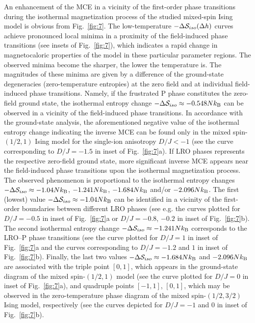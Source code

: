 \documentclass[final,5p,times,sort&compress]{elsarticle}
\begin{document}
An enhancement of the MCE in a vicinity of the first-order phase transitions during the isothermal magnetization process of the studied mixed-spin Ising model is obvious from Fig.~\ref{fig:7}. The low-temperature $-\Delta{\cal S}_{iso}(\Delta h)$ curves achieve pronounced local minima in a proximity of the field-induced phase transitions (see insets of Fig.~\ref{fig:7}), which indicates a rapid change in magnetocaloric properties of the model in these particular parameter regions. The observed minima become the sharper, the lower the temperature is. The magnitudes of these minima are given by a difference of the ground-state degeneracies (zero-temperature entropies) at the zero field and at individual field-induced phase transitions. 
Namely, if the frustrated P phase constitutes the zero-field ground state, the isothermal entropy change $-\Delta {\cal S}_{iso}\approx -0.548Nk_{\rm B}$ can be observed in a vicinity of the field-induced phase transitions. In accordance with the ground-state analysis, the aforementioned negative value of the isothermal entropy change indicating the inverse MCE can be found only in the mixed spin-$(1/2,1)$ Ising model for the single-ion anisotropy $D/J<-1$ (see the curve corresponding to $D/J=-1.5$ in inset of Fig.~\ref{fig:7}a). If LRO phases represents the respective zero-field ground state, more significant inverse MCE appears near the field-induced phase transitions upon the isothermal magnetization process. The observed phenomenon is proportional to the isothermal entropy changes $-\Delta {\cal S}_{iso}\approx -1.04Nk_{\rm B}$, $-1.241Nk_{\rm B}$, $-1.684Nk_{\rm B}$ and/or $-2.096Nk_{\rm B}$. The first (lowest) value $-\Delta {\cal S}_{iso}\approx -1.04Nk_{\rm B}$ can be identified in a vicinity of the first-order boundaries between different LRO phases (see e.g. the curves plotted for $D/J=-0.5$ in inset of Fig.~\ref{fig:7}a or $D/J=-0.8$, $-0.2$ in inset of Fig.~\ref{fig:7}b). The second isothermal entropy change $-\Delta {\cal S}_{iso}\approx -1.241Nk_{\rm B}$ corresponds to the LRO--P phase transitions (see the curve plotted for $D/J=1$ in inset of Fig.~\ref{fig:7}a and the curves corresponding to $D/J=-1.2$ and $1$ in inset of Fig.~\ref{fig:7}b). Finally, the last two values $-\Delta {\cal S}_{iso}\approx -1.684Nk_{\rm B}$ and $-2.096Nk_{\rm B}$ are associated with the triple point $[0, 1]$, which appears in the ground-state diagram of the mixed spin-$(1/2,1)$ model (see the curve plotted for $D/J=0$ in inset of Fig.~\ref{fig:7}a), and quadruple points $[-1, 1]$, $[0, 1]$, which may be observed in the zero-temperature phase diagram of the mixed spin-$(1/2,3/2)$ Ising model, respectively (see the curves depicted for $D/J=-1$ and $0$ in inset of Fig.~\ref{fig:7}b).
\end{document}
